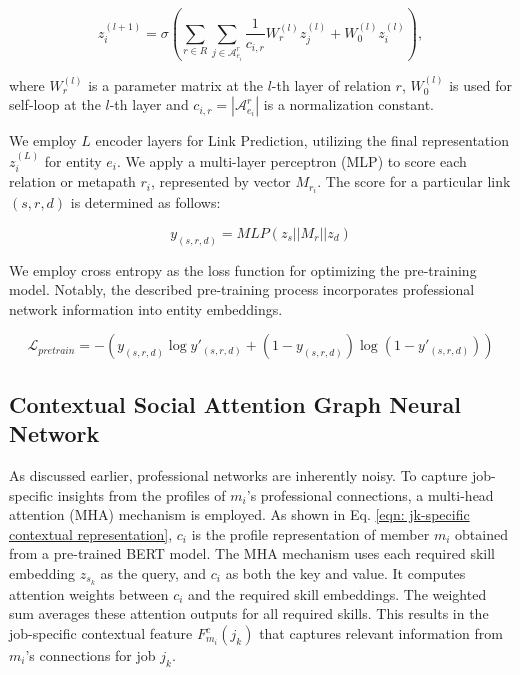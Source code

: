 \begin{equation}
    z_i^{(l+1)}=\sigma\left(\sum_{r\in R}\sum_{j\in {\mathcal{A}_{e_i}^{r}}}\frac{1}{c_{i,r}} W_r^{(l)} z_j^{(l)} + W_0^{(l)}z_i^{(l)}\right),
\end{equation}

where $W_r^{(l)}$ is a parameter matrix at the $l$-th layer of relation $r$, $W_0^{(l)}$ is used for self-loop at the $l$-th layer and $c_{i, r} = \left|\mathcal{A}_{e_i}^{r}\right|$ is a normalization constant.

We employ $L$ encoder layers for Link Prediction, utilizing the final representation $z_i^{(L)}$ for entity $e_i$. We apply a multi-layer perceptron (MLP) to score each relation or metapath $r_i$, represented by vector $M_{r_i}$. The score for a particular link $(s, r, d)$ is determined as follows:

\begin{equation}
y_{(s, r, d)}= MLP(z_s||M_r||z_d)
\end{equation}

We employ cross entropy as the loss function for optimizing the pre-training model. Notably, the described pre-training process incorporates professional network information into entity embeddings.

\begin{equation}
    \label{eqn: pretrain_loss}
    \mathcal{L}_{pretrain}=-\left(y_{(s, r, d)}\log y'_{(s, r, d)}+\left(1-y_{(s, r, d)}\right)\log\left(1-y'_{(s, r, d)}\right)\right)
\end{equation}

\subsection{Contextual Social Attention Graph Neural Network}
\label{Contextual Social Attention Graph Neural Network}

As discussed earlier, professional networks are inherently noisy. To capture job-specific insights from the profiles of $m_i$'s professional connections, a multi-head attention (MHA) mechanism \cite{vaswani2017attention} is employed. As shown in Eq. \ref{eqn: jk-specific contextual representation}, $c_i$ is the profile representation of member $m_i$ obtained from a pre-trained BERT model. The MHA mechanism uses each required skill embedding $z_{s_k}$ as the query, and $c_i$ as both the key and value. It computes attention weights between $c_i$ and the required skill embeddings. The weighted sum averages these attention outputs for all required skills. This results in the job-specific contextual feature $F_{m_i}^c(j_k)$ that captures relevant information from $m_i$'s connections for job $j_k$.

